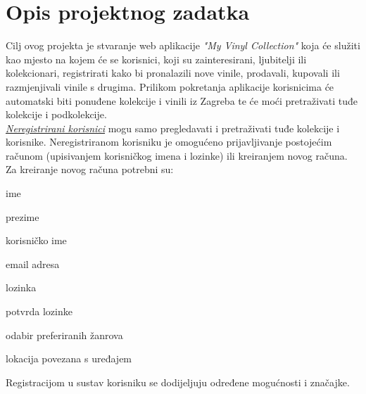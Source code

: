 \chapter{Opis projektnog zadatka}
		
%		
%		
	
		\text Cilj ovog projekta je stvaranje web aplikacije \textit{"My Vinyl Collection"} koja će služiti kao mjesto na kojem će se korisnici, koji su zainteresirani, ljubitelji ili kolekcionari, registrirati kako bi pronalazili nove vinile, prodavali, kupovali ili razmjenjivali vinile s drugima.
		Prilikom pokretanja aplikacije korisnicima će automatski biti ponuđene kolekcije i vinili iz Zagreba te će moći pretraživati tuđe kolekcije i podkolekcije.\\
		
		\textit{\underline{Neregistrirani korisnici}} mogu samo pregledavati i pretraživati tuđe kolekcije i korisnike. Neregistriranom korisniku je omogućeno prijavljivanje postojećim računom (upisivanjem korisničkog imena i lozinke) ili kreiranjem novog računa. Za kreiranje novog računa potrebni su: 
		\begin{packed_item}
			\item ime
			\item prezime
			\item korisničko ime
			\item email adresa
			\item lozinka
			\item potvrda lozinke
			\item odabir preferiranih žanrova
			\item lokacija povezana s uređajem
		\end{packed_item}
Registracijom u sustav korisniku se dodijeljuju određene mogućnosti i značajke.\\


